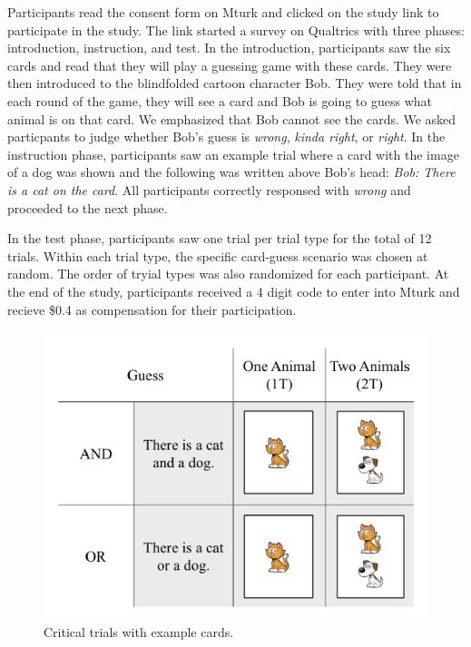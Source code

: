 \documentclass[10pt, letterpaper]{article}
\newenvironment{CodeChunk}{}{}
\begin{document}
Participants read the consent form on Mturk and clicked on the study
link to participate in the study. The link started a survey on Qualtrics
with three phases: introduction, instruction, and test. In the
introduction, participants saw the six cards and read that they will
play a guessing game with these cards. They were then introduced to the
blindfolded cartoon character Bob. They were told that in each round of
the game, they will see a card and Bob is going to guess what animal is
on that card. We emphasized that Bob cannot see the cards. We asked
particpants to judge whether Bob's guess is \emph{wrong}, \emph{kinda
right}, or \emph{right}. In the instruction phase, participants saw an
example trial where a card with the image of a dog was shown and the
following was written above Bob's head: \emph{Bob: There is a cat on the
card}. All participants correctly responsed with \emph{wrong} and
proceeded to the next phase.

In the test phase, participants saw one trial per trial type for the
total of 12 trials. Within each trial type, the specific card-guess
scenario was chosen at random. The order of tryial types was also
randomized for each participant. At the end of the study, participants
received a 4 digit code to enter into Mturk and recieve \$0.4 as
compensation for their participation.

\begin{CodeChunk}
\captionsetup{width=0.8\columnwidth}\begin{figure}[t]

{\centering \includegraphics{figs/critical-1} 

}

\caption[Critical trials with example cards]{Critical trials with example cards.}\label{fig:critical}
\end{figure}
\end{CodeChunk}
\end{document}

